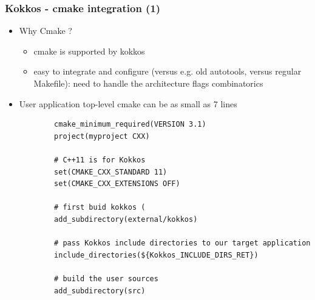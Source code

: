 \begin{frame}[fragile=singleslide]
  \frametitle{Kokkos - cmake integration (1)}

  \begin{itemize}
  \item Why Cmake ?
    \begin{itemize}
    \item cmake is supported by kokkos
    \item easy to integrate and configure (versus e.g. old autotools, versus regular Makefile): need to handle the architecture flags combinatorics
    \end{itemize}
  \item User application top-level cmake can be as small as 7 lines
    {\small
      \begin{verbatim}
        cmake_minimum_required(VERSION 3.1)
        project(myproject CXX)
        
        # C++11 is for Kokkos
        set(CMAKE_CXX_STANDARD 11)
        set(CMAKE_CXX_EXTENSIONS OFF)
        
        # first buid kokkos (
        add_subdirectory(external/kokkos)
        
        # pass Kokkos include directories to our target application
        include_directories(${Kokkos_INCLUDE_DIRS_RET})
        
        # build the user sources
        add_subdirectory(src)
      \end{verbatim}
      }
  \end{itemize}
  
\end{frame}


